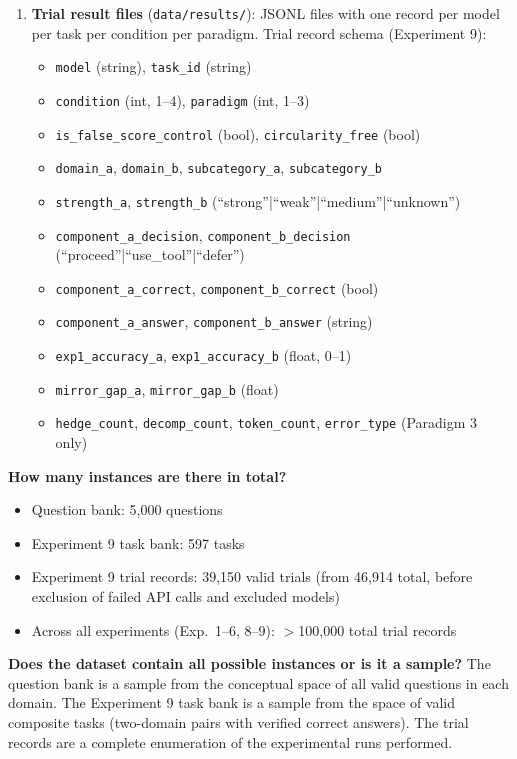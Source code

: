 \begin{enumerate}
  \item \textbf{Trial result files} (\texttt{data/results/}): JSONL files with one record
    per model per task per condition per paradigm. Trial record schema (Experiment 9):
    \begin{itemize}
      \item \texttt{model} (string), \texttt{task\_id} (string)
      \item \texttt{condition} (int, 1--4), \texttt{paradigm} (int, 1--3)
      \item \texttt{is\_false\_score\_control} (bool), \texttt{circularity\_free} (bool)
      \item \texttt{domain\_a}, \texttt{domain\_b}, \texttt{subcategory\_a}, \texttt{subcategory\_b}
      \item \texttt{strength\_a}, \texttt{strength\_b} (``strong''|``weak''|``medium''|``unknown'')
      \item \texttt{component\_a\_decision}, \texttt{component\_b\_decision}
        (``proceed''|``use\_tool''|``defer'')
      \item \texttt{component\_a\_correct}, \texttt{component\_b\_correct} (bool)
      \item \texttt{component\_a\_answer}, \texttt{component\_b\_answer} (string)
      \item \texttt{exp1\_accuracy\_a}, \texttt{exp1\_accuracy\_b} (float, 0--1)
      \item \texttt{mirror\_gap\_a}, \texttt{mirror\_gap\_b} (float)
      \item \texttt{hedge\_count}, \texttt{decomp\_count}, \texttt{token\_count},
        \texttt{error\_type} (Paradigm 3 only)
    \end{itemize}
\end{enumerate}

\textbf{How many instances are there in total?}
\begin{itemize}
  \item Question bank: 5,000 questions
  \item Experiment 9 task bank: 597 tasks
  \item Experiment 9 trial records: 39,150 valid trials (from 46,914 total, before
    exclusion of failed API calls and excluded models)
  \item Across all experiments (Exp.\ 1--6, 8--9): $>$100,000 total trial records
\end{itemize}

\textbf{Does the dataset contain all possible instances or is it a sample?}
The question bank is a sample from the conceptual space of all valid questions
in each domain. The Experiment 9 task bank is a sample from the space of valid
composite tasks (two-domain pairs with verified correct answers). The trial records
are a complete enumeration of the experimental runs performed.

